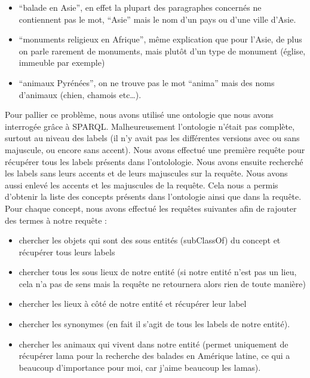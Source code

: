 \documentclass{article}
\begin{document}
\begin{itemize}

    \item “balade en Asie”, en effet la plupart des paragraphes concernés ne
        contiennent pas le mot, “Asie” mais le nom d’un pays ou d’une ville d’Asie.

    \item “monuments religieux en Afrique”, même explication que pour l’Asie, de plus
        on parle rarement de monuments, mais plutôt d’un type de monument (église,
        immeuble par exemple)

    \item “animaux Pyrénées”, on ne trouve pas le mot “anima” mais des noms d’animaux
        (chien, chamois etc…).

\end{itemize}


Pour pallier ce problème, nous avons utilisé une ontologie que nous avons interrogée
grâce à SPARQL. Malheureusement l'ontologie n'était pas complète,
surtout au niveau des labels (il n’y avait pas les différentes versions avec ou sans
majuscule, ou encore sans accent). Nous avons effectué une première requête pour
récupérer tous les labels présents dans l’ontolologie. Nous avons ensuite recherché
les labels sans leurs accents et de leurs majuscules sur la requête. Nous avons aussi
enlevé les accents et les majuscules de la requête. Cela nous a permis d’obtenir la
liste des concepts présents dans l’ontologie ainsi que dans la requête. Pour chaque
concept, nous avons effectué les requêtes suivantes afin de rajouter des termes
à notre requête :

\begin{itemize}

    \item chercher les objets qui sont des sous entités (subClassOf) du concept et
        récupérer tous leurs labels

    \item chercher tous les sous lieux de notre entité (si notre entité n’est pas un
        lieu, cela n’a pas de sens mais la requête ne retournera alors rien de toute
        manière)

    \item chercher les lieux à côté de notre entité et récupérer leur label

    \item chercher les synonymes (en fait il s’agit de tous les labels de notre
        entité).

    \item chercher les animaux qui vivent dans notre entité (permet uniquement de
        récupérer lama pour la recherche des balades en Amérique latine, ce qui
        a beaucoup d’importance pour moi, car j’aime beaucoup les lamas).

\end{itemize}
\end{document}
